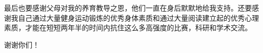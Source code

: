 \documentclass[doctor,privacy,twoside]{buaa_mac}
\begin{document}
最后也要感谢父母对我的养育教导之恩，他们一直在身后默默地给我支持。还要感谢我自己通过大量健身运动锻炼的优秀身体素质和通过大量阅读建立起的优秀心理素质，才能在短短两年半的时间内抗住这么多高强度的比赛，科研和学术交流。

谢谢你们！


%

%

\vspace{5cm}
\end{document}
